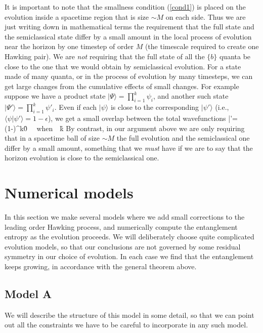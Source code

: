 \documentclass[12pt]{article}
\begin{document}
It is important to note that the smallness condition (\ref{cond1}) is placed on the evolution inside a spacetime region that is size $\sim M$ on each side. Thus we are just writing down in mathematical terms the requirement that the full state and the semiclassical state differ by a small amount in the local process of evolution near the horizon by one timestep of order $M$ (the timescale required to create one Hawking pair). We are {\it not} requiring that the full state of all the $\{b\}$ quanta be close to the one that we would obtain by semiclassical evolution. For a state made of many quanta, or in the process of evolution by many timesteps, we can get large changes from the cumulative effects of small changes. For example suppose we have a product state $|\Psi\rangle=\prod_{i=1}^k \psi_i$, and another such state $|\Psi'\rangle=\prod_{i=1}^k\psi'_i$. Even if each $|\psi\rangle$ is close to the corresponding $|\psi'\rangle$ (i.e., $\langle\psi|\psi'\rangle=1-\epsilon$), we get a small overlap between the total wavefunctions
\be
\langle \Psi|\Psi'\rangle=(1-\epsilon)^k\r 0 ~~{\rm when}~~k\r \infty
\ee
By contrast, in our argument above we are only requiring that in a spacetime ball of size $\sim M$ the full evolution and the semiclassical one differ by a small amount, something that we {\it must} have if we are to say that the horizon evolution is close to the semiclassical one.  



\section{Numerical models}
\label{secthree}\setcounter{equation}{0}

In this section we make several models where we add small corrections to the leading order Hawking process, and numerically compute the entanglement entropy as the evolution proceeds. We will deliberately choose quite complicated evolution models, so that our conclusions are not governed by some residual symmetry in our choice of evolution.   In each case we find that the entanglement keeps growing, in accordance with the general theorem above.


\subsection{Model A}

We will describe the structure of this model in some detail, so that we can point out all the constraints we have to be careful to incorporate in any such model. 
\end{document}
